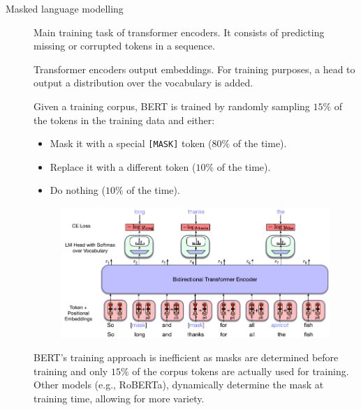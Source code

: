 \begin{description}
    \item[Masked language modelling] 
        Main training task of transformer encoders. It consists of predicting missing or corrupted tokens in a sequence.

        \begin{remark}
            Transformer encoders output embeddings. For training purposes, a head to output a distribution over the vocabulary is added.
        \end{remark}

        \begin{example}
            Given a training corpus, BERT is trained by randomly sampling $15\%$ of the tokens in the training data and either:
            \begin{itemize}
                \item Mask it with a special \texttt{[MASK]} token ($80\%$ of the time).
                \item Replace it with a different token ($10\%$ of the time).
                \item Do nothing ($10\%$ of the time).
            \end{itemize}

            \begin{figure}[H]
                \centering
                \includegraphics[width=0.6\linewidth]{./img/_bert_training.pdf}
            \end{figure}

            \indenttbox
            \begin{remark}
                BERT's training approach is inefficient as masks are determined before training and only $15\%$ of the corpus tokens are actually used for training. Other models (e.g., RoBERTa), dynamically determine the mask at training time, allowing for more variety.
            \end{remark}
        \end{example}
\end{description}